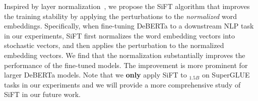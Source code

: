 Inspired by layer normalization~\citep{ba2016layer}, we propose the SiFT algorithm that improves the training stability by applying the perturbations to the \emph{normalized} word embeddings. 
Specifically, when fine-tuning DeBERTa to a downstream NLP task in our experiments, SiFT first normalizes the word embedding vectors into stochastic vectors, and then applies the perturbation to the normalized embedding vectors. We find that the normalization substantially improves the performance of the fine-tuned models. The improvement is more prominent for larger DeBERTa models. 
Note that we \textbf{only} apply SiFT to  {\ModelName}$_{1.5B}$ on SuperGLUE tasks in our experiments and we will provide a more comprehensive study of SiFT in our future work.

